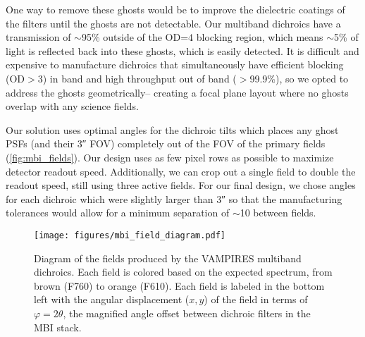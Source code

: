 One way to remove these ghosts would be to improve the dielectric coatings of the filters until the ghosts are not detectable. Our multiband dichroics have a transmission of $\sim$95\% outside of the OD=$4$ blocking region, which means $\sim$5\% of light is reflected back into these ghosts, which is easily detected. It is difficult and expensive to manufacture dichroics that simultaneously have efficient blocking (OD$>$3) in band and high throughput out of band ($>$99.9\%), so we opted to address the ghosts geometrically-- creating a focal plane layout where no ghosts overlap with any science fields.

Our solution uses optimal angles for the dichroic tilts which places any ghost PSFs (and their \ang{;;3} FOV) completely out of the FOV of the primary fields (\autoref{fig:mbi_fields}). Our design uses as few pixel rows as possible to maximize detector readout speed. Additionally, we can crop out a single field to double the readout speed, still using three active fields. For our final design, we chose angles for each dichroic which were slightly larger than \ang{;;3} so that the manufacturing tolerances would allow for a minimum separation of $\sim$\SI{10}{\pixel} between fields.

\begin{figure}
    \centering
    \texttt{[image: figures/mbi\_field\_diagram.pdf]}
    \caption{Diagram of the fields produced by the VAMPIRES multiband dichroics. Each field is colored based on the expected spectrum, from brown (F760) to orange (F610). Each field is labeled in the bottom left with the angular displacement ($x,y$) of the field in terms of $\varphi=2\theta$, the magnified angle offset between dichroic filters in the MBI stack.\label{fig:mbi_fields}}
\end{figure}